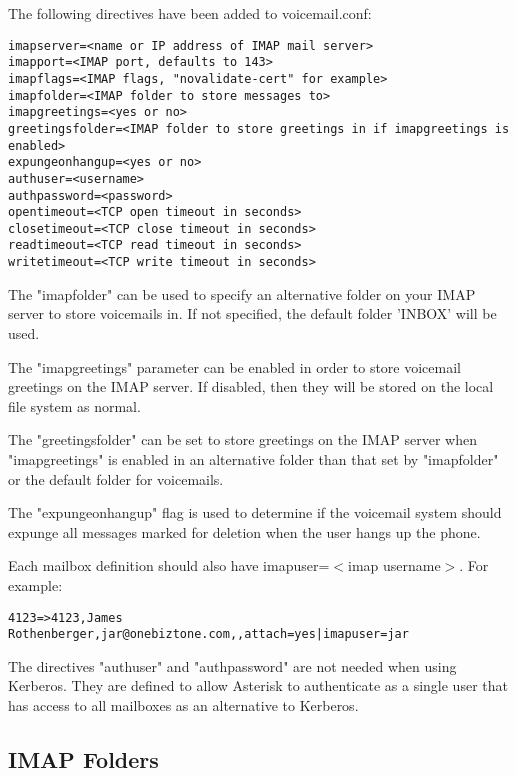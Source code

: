 The following directives have been added to voicemail.conf:
\begin{astlisting}
\begin{verbatim}
imapserver=<name or IP address of IMAP mail server>
imapport=<IMAP port, defaults to 143>
imapflags=<IMAP flags, "novalidate-cert" for example>
imapfolder=<IMAP folder to store messages to>
imapgreetings=<yes or no>
greetingsfolder=<IMAP folder to store greetings in if imapgreetings is enabled>
expungeonhangup=<yes or no>
authuser=<username>
authpassword=<password>
opentimeout=<TCP open timeout in seconds>
closetimeout=<TCP close timeout in seconds>
readtimeout=<TCP read timeout in seconds>
writetimeout=<TCP write timeout in seconds>
\end{verbatim}
\end{astlisting}

The "imapfolder" can be used to specify an alternative folder on your IMAP server
to store voicemails in. If not specified, the default folder 'INBOX' will be used.

The "imapgreetings" parameter can be enabled in order to store voicemail greetings
on the IMAP server. If disabled, then they will be stored on the local file system
as normal.

The "greetingsfolder" can be set to store greetings on the IMAP server when
"imapgreetings" is enabled in an alternative folder than that set by "imapfolder"
or the default folder for voicemails.

The "expungeonhangup" flag is used to determine if the voicemail system should
expunge all messages marked for deletion when the user hangs up the phone.

Each mailbox definition should also have imapuser=$<$imap username$>$.
For example:
\begin{astlisting}
\begin{verbatim}
4123=>4123,James Rothenberger,jar@onebiztone.com,,attach=yes|imapuser=jar
\end{verbatim}
\end{astlisting}

The directives "authuser" and "authpassword" are not needed when using
Kerberos. They are defined to allow Asterisk to authenticate as a single
user that has access to all mailboxes as an alternative to Kerberos.


\subsection{IMAP Folders}

